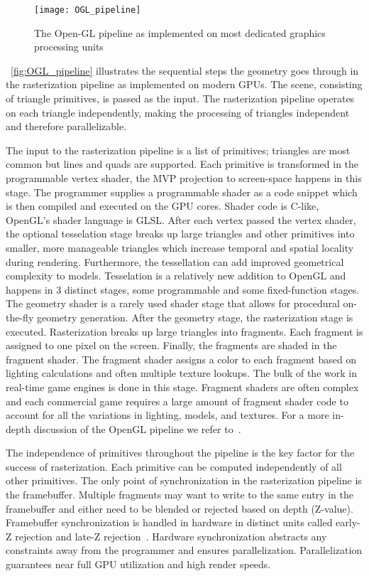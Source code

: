 \begin{figure}[htb]
  \centering
  \texttt{[image: OGL\_pipeline]}
 
  \caption{\label{fig:OGL_pipeline} The Open-GL pipeline as implemented on most dedicated graphics processing units~\cite{kronosgl:2017, 10.1145/3307650.3322221}}
\end{figure}

~\autoref{fig:OGL_pipeline} illustrates the sequential steps the geometry goes through in the rasterization pipeline as implemented on modern GPUs. The scene, consisting of triangle primitives, is passed as the input. The rasterization pipeline operates on each triangle independently, making the processing of triangles independent and therefore parallelizable. 

The input to the rasterization pipeline is a list of primitives; triangles are most common but lines and quads are supported. Each primitive is transformed in the programmable vertex shader, the MVP projection to screen-space happens in this stage. The programmer supplies a programmable shader as a code snippet which is then compiled and executed on the GPU cores. Shader code is C-like, OpenGL's shader language is GLSL. 
After each vertex passed the vertex shader, the optional tesselation stage breaks up large triangles and other primitives into smaller, more manageable triangles which increase temporal and spatial locality during rendering. Furthermore, the tessellation can add improved geometrical complexity to models. Tesselation is a relatively new addition to OpenGL and happens in 3 distinct stages, some programmable and some fixed-function stages. 
The geometry shader is a rarely used shader stage that allows for procedural on-the-fly geometry generation.
After the geometry stage, the rasterization stage is executed. Rasterization breaks up large triangles into fragments. Each fragment is assigned to one pixel on the screen. 
Finally, the fragments are shaded in the fragment shader. The fragment shader assigns a color to each fragment based on lighting calculations and often multiple texture lookups. The bulk of the work in real-time game engines is done in this stage. Fragment shaders are often complex and each commercial game requires a large amount of fragment shader code to account for all the variations in lighting, models, and textures. 
For a more in-depth discussion of the OpenGL pipeline we refer to~\cite{kronosgl:2017, 10.1145/3307650.3322221}.

The independence of primitives throughout the pipeline is the key factor for the success of rasterization. Each primitive can be computed independently of all other primitives. The only point of synchronization in the rasterization pipeline is the framebuffer. Multiple fragments may want to write to the same entry in the framebuffer and either need to be blended or rejected based on depth (Z-value). Framebuffer synchronization is handled in hardware in distinct units called early-Z rejection and late-Z rejection~\cite{10.1145/3307650.3322221}. Hardware synchronization abstracts any constraints away from the programmer and ensures parallelization. Parallelization guarantees near full GPU utilization and high render speeds. 

